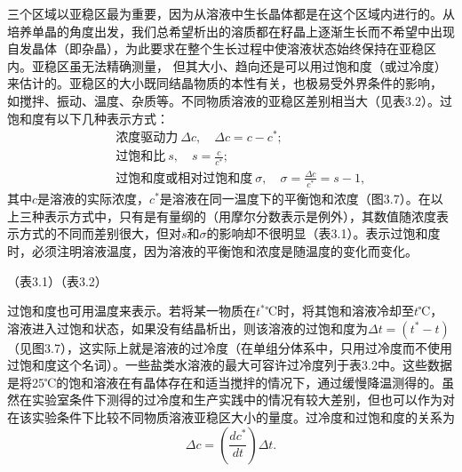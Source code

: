 三个区域以亚稳区最为重要，因为从溶液中生长晶体都是在这个区域内进行的。从培养单晶的角度出发，我们总希望析出的溶质都在籽晶上逐渐生长而不希望中出现自发晶体（即杂晶），为此要求在整个生长过程中使溶液状态始终保持在亚稳区内。亚稳区虽无法精确测量， 但其大小、趋向还是可以用过饱和度（或过冷度）来估计的。亚稳区的大小既同结晶物质的本性有关，也极易受外界条件的影响， 如搅拌、振动、温度、杂质等。不同物质溶液的亚稳区差别相当大（见表3.2）。过饱和度有以下几种表示方式：
\begin{eqnarray}
&& \text{浓度驱动力}\ \Delta c,\quad\Delta c=c-c^*; \\
&& \text{过饱和比}\ s,\quad s=\frac{c}{c^*}; \\
&& \text{过饱和度或相对过饱和度}\ \sigma,\quad\sigma=\frac{\Delta c}{c^*}=s-1,
\end{eqnarray}
其中$c$是溶液的实际浓度，$c^*$是溶液在同一温度下的平衡饱和浓度（图3.7）。在以上三种表示方式中，只有是有量纲的（用摩尔分数表示是例外），其数值随浓度表示方式的不同而差别很大，但对$s$和$\sigma$的影响却不很明显（表3.1）。表示过饱和度时，必须注明溶液温度，因为溶液的平衡饱和浓度是随温度的变化而变化。

（表3.1）（表3.2）

过饱和度也可用温度来表示。若将某一物质在$t^*$℃时，将其饱和溶液冷却至$t$℃，溶液进入过饱和状态，如果没有结晶析出，则该溶液的过饱和度为$\Delta t=(t^*-t)$（见图3.7），这实际上就是溶液的过冷度（在单组分体系中，只用过冷度而不使用过饱和度这个名词）。一些盐类水溶液的最大可容许过冷度列于表3.2中。这些数据是将25℃的饱和溶液在有晶体存在和适当搅拌的情况下，通过缓慢降温测得的。虽然在实验室条件下测得的过冷度和生产实践中的情况有较大差别，但也可以作为对在该实验条件下比较不同物质溶液亚稳区大小的量度。过冷度和过饱和度的关系为
\begin{equation}
\Delta c = \left(\frac{dc^*}{dt}\right)\Delta t.
\end{equation}
